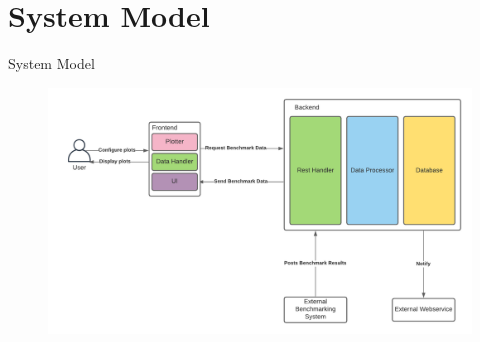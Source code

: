 \section{System Model}

\begin{frame}{System Model}
    \begin{figure}[H]
        \includegraphics[width=\textwidth]{images/systemmodel.pdf}
        \label{fig:systemmodel}
    \end{figure}
\end{frame}


